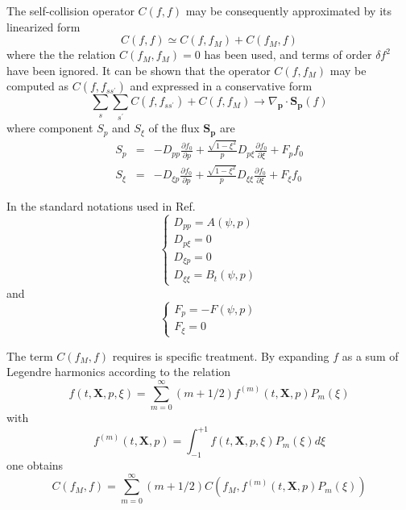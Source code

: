 The self-collision operator $C\left( f,f\right) $ may be consequently
approximated by its linearized form
\begin{equation}
C\left( f,f\right) \simeq C\left( f,f_{M}\right) +C\left( f_{M},f\right)
\end{equation}
where the the relation $C\left( f_{M},f_{M}\right) =0$ has been used, and
terms of order $\delta f^{2}$ have been ignored. It can be shown that the
operator $C\left( f,f_{M}\right) $ may be computed as $C\left(
f,f_{ss^{\prime }}\right) $ and expressed in a conservative form
\begin{equation}
\sum_{s}\sum_{s^{\prime }}C\left( f,f_{ss^{\prime }}\right) +C\left(
f,f_{M}\right) \rightarrow \nabla _{\mathbf{p}}\cdot \mathbf{S}_{\mathbf{p}
}\left( f\right)
\end{equation}
where component $S_{p}$ and $S_{\xi }$ of the flux $\mathbf{S}_{\mathbf{p}}$
are
\begin{eqnarray}
S_{p} &=&-D_{pp}\frac{\partial f_{0}}{\partial p}+\frac{\sqrt{1-\xi ^{2}}}{p}
D_{p\xi }\frac{\partial f_{0}}{\partial \xi }+F_{p}f_{0} \\
S_{\xi } &=&-D_{\xi p}\frac{\partial f_{0}}{\partial p}+\frac{\sqrt{1-\xi
^{2}}}{p}D_{\xi \xi }\frac{\partial f_{0}}{\partial \xi }+F_{\xi }f_{0}
\end{eqnarray}

In the standard notations used in Ref. \cite{shk97}
\begin{equation}
\left\{
\begin{array}{l}
D_{pp}=A\left( \psi ,p\right)  \\
D_{p\xi }=0 \\
D_{\xi p}=0 \\
D_{\xi \xi }=B_{t}\left( \psi ,p\right)
\end{array}
\right.   \label{Dcoll}
\end{equation}
and
\begin{equation}
\left\{
\begin{array}{l}
F_{p}=-F\left( \psi ,p\right)  \\
F_{\xi }=0
\end{array}
\right.   \label{Fcoll}
\end{equation}

The term $C\left( f_{M},f\right) $ requires is specific treatment. By
expanding $f$ as a sum of Legendre harmonics according to the relation
\begin{equation}
f\left( t,\mathbf{X},p,\xi \right) =\sum_{m=0}^{\infty }\left( m+1/2\right)
f^{\left( m\right) }\left( t,\mathbf{X},p\right) P_{m}\left( \xi \right)
\end{equation}
with
\begin{equation}
f^{\left( m\right) }\left( t,\mathbf{X},p\right) =\int_{-1}^{+1}f\left( t,%
\mathbf{X},p,\xi \right) P_{m}\left( \xi \right) d\xi
\end{equation}
one obtains
\begin{equation}
C\left( f_{M},f\right) =\sum_{m=0}^{\infty }\left( m+1/2\right) C\left(
f_{M},f^{\left( m\right) }\left( t,\mathbf{X},p\right) P_{m}\left( \xi
\right) \right)
\end{equation}

